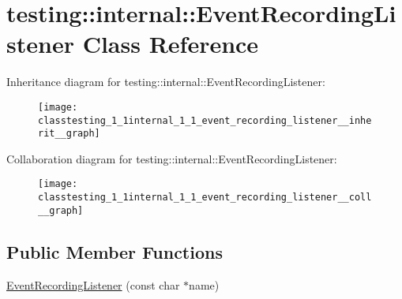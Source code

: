 \hypertarget{classtesting_1_1internal_1_1_event_recording_listener}{}\section{testing\+:\+:internal\+:\+:Event\+Recording\+Listener Class Reference}
\label{classtesting_1_1internal_1_1_event_recording_listener}


Inheritance diagram for testing\+:\+:internal\+:\+:Event\+Recording\+Listener\+:
\nopagebreak
\begin{figure}[H]
\begin{center}
\leavevmode
\texttt{[image: classtesting\_1\_1internal\_1\_1\_event\_recording\_listener\_\_inherit\_\_graph]}
\end{center}
\end{figure}


Collaboration diagram for testing\+:\+:internal\+:\+:Event\+Recording\+Listener\+:
\nopagebreak
\begin{figure}[H]
\begin{center}
\leavevmode
\texttt{[image: classtesting\_1\_1internal\_1\_1\_event\_recording\_listener\_\_coll\_\_graph]}
\end{center}
\end{figure}
\subsection*{Public Member Functions}
\begin{DoxyCompactItemize}
\item 
\hyperlink{classtesting_1_1internal_1_1_event_recording_listener_a7b0254c15d6b8468e1441ee572fee707}{Event\+Recording\+Listener} (const char $\ast$name)
\end{DoxyCompactItemize}
